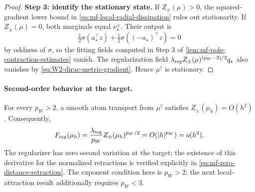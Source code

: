\begin{proof}
\par\noindent\textbf{Step 3: identify the stationary state.}
If \(Z_\pm(\mu)>0\), the squared-gradient lower bound in
\cref{eq:mf-local-radial-dissipation} rules out stationarity. If
\(Z_\pm(\mu)=0\), both marginals equal \(\nu_\star^\pm\). Their output is
\[
 \tfrac12\sigma(a_\star^\top z)+
 \tfrac12\sigma((-a_\star)^\top z)=0
\]
by oddness of \(\sigma\), so the fitting fields computed in Step 3 of
\cref{lem:mf-pole-contraction-estimates} vanish. The regularization field
\(\lambda_{\mathrm{reg}} Z_\pm(\mu)^{(p_W-2)/2}q_\star\) also vanishes by
\cref{eq:W2-dirac-metric-gradient}. Hence \(\mu^\dagger\) is stationary.
\end{proof}

\paragraph{Second-order behavior at the target.}
For every \(p_W>2\), a smooth atom transport from \(\mu^\dagger\)
satisfies \(Z_\pm(\mu_h)=O(h^2)\). Consequently,
\[
 F_{\mathrm{reg}}(\mu_h)
 =\frac{\lambda_{\mathrm{reg}}}{p_W}Z_\pm(\mu_h)^{p_W/2}
 =O(|h|^{p_W})=o(h^2).
\]
The regularizer has zero second variation at the target; the existence
of this derivative for the normalized retractions is verified explicitly
in \cref{eq:mf-zero-distance-retraction}. The exponent condition here is
\(p_W>2\); the next local-attraction result additionally requires \(p_W<3\).

